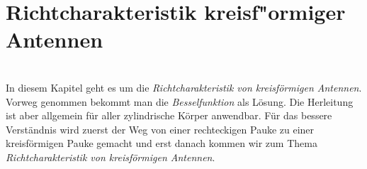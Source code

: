 \chapter{Richtcharakteristik kreisf"ormiger Antennen\label{chapter:kreis}}
\begin{refsection}
\\
%
%
%
In diesem Kapitel geht es um die \emph{Richtcharakteristik von kreisf\"ormigen Antennen}.
Vorweg genommen bekommt man die \emph{Besselfunktion} als L\"osung.
Die Herleitung ist aber allgemein f\"ur aller zylindrische K\"orper anwendbar.
F\"ur das bessere Verst\"andnis wird zuerst der Weg von einer rechteckigen Pauke zu einer kreisf\"ormigen Pauke gemacht und erst danach kommen wir zum Thema \emph{Richtcharakteristik von kreisf\"ormigen Antennen}.
%
%
%

\end{refsection}
